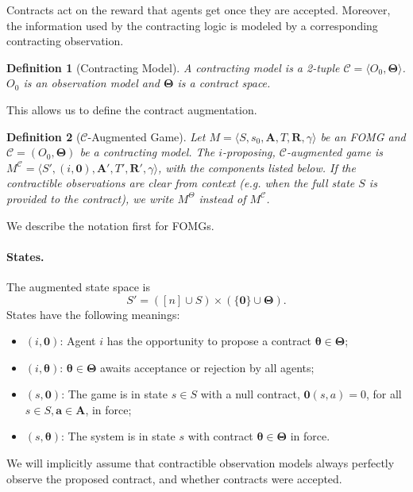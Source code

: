 \documentclass[referee,sn-basic]{sn-jnl}
\newcommand{\bld}[1]{\boldsymbol{#1}}
\theoremstyle{thmstyleone}%
\theoremstyle{thmstyletwo}%
\theoremstyle{thmstylethree}%
\newtheorem{definition}{Definition}%
\begin{document}
Contracts act on the reward that agents get once they are accepted. Moreover, the information used by the contracting logic is modeled by a corresponding contracting observation.

\begin{definition}[Contracting Model]
    A contracting model is a 2-tuple $\mathcal{C} = \langle O_0, \bld{\Theta}\rangle$. $O_0$ is an observation model and $\bld{\Theta}$ is a contract space.
\end{definition}

This allows us to define the contract augmentation.

\begin{definition}[$\boldsymbol{\mathcal{C}}$-Augmented Game]
Let $M = \langle S, s_0, \mathbf A, T, \mathbf R, \gamma \rangle$ be an FOMG and $\mathcal{C} = (O_0, \boldsymbol\Theta)$ be a contracting model. The $i$-proposing, \emph{$\boldsymbol{\mathcal{C}}$-augmented game} is $M^{\boldsymbol{\mathcal{C}}} = \langle S', (i, \boldsymbol 0), \mathbf A', T', \mathbf R', \gamma \rangle$, with the components listed below. If the contractible  observations are clear from context (e.g. when the full state $S$ is provided to the contract), we write $M^\Theta$ instead of $M^\mathcal{C}$.
\end{definition}
We describe the notation first for FOMGs.
\paragraph{States.} The augmented state space is
\[
S' = ([n] \cup S) \times (\{\boldsymbol 0\} \cup \boldsymbol\Theta).
\]
States have the following meanings:
\begin{itemize}
\item $(i, \boldsymbol 0)$: Agent $i$ has the opportunity to propose a contract $\boldsymbol\theta \in \boldsymbol\Theta$;
\item $(i, \boldsymbol\theta)$: $\boldsymbol\theta \in \boldsymbol\Theta$ awaits acceptance or rejection by all agents;
\item $(s, \boldsymbol 0)$: The game is in state $s \in S$ with a null contract, $\boldsymbol 0(s,a) = 0$, for all $s \in S, \mathbf a \in \mathbf A$, in force;
\item $(s, \boldsymbol\theta)$:  The system is in state $s$ with contract $\boldsymbol\theta \in \boldsymbol\Theta$ in force.
\end{itemize}
We will implicitly assume that contractible observation models always perfectly observe the proposed contract, and whether contracts were accepted. 
\end{document}
